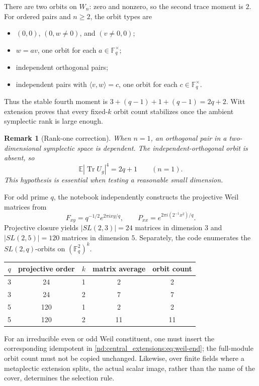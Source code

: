 \documentclass[10pt]{article}
\newcommand{\Tr}{\operatorname{Tr}}
\newcommand{\F}{\mathbb F}
\newtheorem{remark}{Remark}
\begin{document}
There are two orbits on $W_n$: zero and nonzero, so the second trace moment
is $2$.  For ordered pairs and $n\geq2$, the orbit types are
\begin{itemize}
\item $(0,0)$, $(0,w\ne0)$, and $(v\ne0,0)$;
\item $w=av$, one orbit for each $a\in\F_q^\times$;
\item independent orthogonal pairs;
\item independent pairs with $\langle v,w\rangle=c$, one orbit for each
      $c\in\F_q^\times$.
\end{itemize}
Thus the stable fourth moment is $3+(q-1)+1+(q-1)=2q+2$.
Witt extension proves that every fixed-$k$ orbit count stabilizes once the
ambient symplectic rank is large enough.

\begin{remark}[Rank-one correction]
When $n=1$, an orthogonal pair in a two-dimensional symplectic space is
dependent.  The independent-orthogonal orbit is absent, so
\begin{equation}\label{nd:central_extensions:eq:rank-one-weil}
 \mathbb E|\Tr U_g|^4=2q+1\qquad(n=1).
\end{equation}
This hypothesis is essential when testing a reasonable small dimension.
\end{remark}

For odd prime $q$, the notebook independently constructs the projective Weil
matrices from
\[
 F_{xy}=q^{-1/2}e^{2\pi ixy/q},\qquad
 P_{xx}=e^{2\pi i(2^{-1}x^2)/q}.
\]
Projective closure yields $|SL(2,3)|=24$ matrices in dimension $3$ and
$|SL(2,5)|=120$ matrices in dimension $5$.  Separately, the code enumerates
the $SL(2,q)$-orbits on $(\F_q^2)^k$.

\begin{center}
\begin{tabular}{@{}c c c c c@{}}
\toprule
$q$ & projective order & $k$ & matrix average & orbit count\\
\midrule
3 & 24  & 1 & 2 & 2\\
3 & 24  & 2 & 7 & 7\\
5 & 120 & 1 & 2 & 2\\
5 & 120 & 2 & 11 & 11\\
\bottomrule
\end{tabular}
\end{center}

For an irreducible even or odd Weil constituent, one must insert the
corresponding idempotent in \eqref{nd:central_extensions:eq:weil-end}; the full-module orbit count
must not be copied unchanged.  Likewise, over finite fields where a
metaplectic extension splits, the actual scalar image, rather than the name
of the cover, determines the selection rule.
\end{document}
